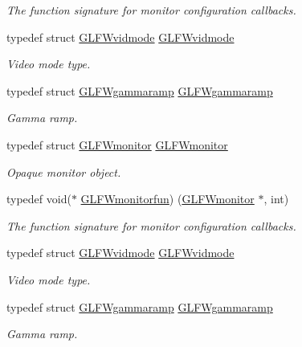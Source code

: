 \begin{DoxyCompactItemize}
\begin{DoxyCompactList}\small\item\em The function signature for monitor configuration callbacks. \end{DoxyCompactList}\item 
typedef struct \hyperlink{structGLFWvidmode}{G\+L\+F\+Wvidmode} \hyperlink{group__monitor_gae48aadf4ea0967e6605c8f58fa5daccb}{G\+L\+F\+Wvidmode}
\begin{DoxyCompactList}\small\item\em Video mode type. \end{DoxyCompactList}\item 
typedef struct \hyperlink{structGLFWgammaramp}{G\+L\+F\+Wgammaramp} \hyperlink{group__monitor_gaec0bd37af673be8813592849f13e02f0}{G\+L\+F\+Wgammaramp}
\begin{DoxyCompactList}\small\item\em Gamma ramp. \end{DoxyCompactList}\item 
typedef struct \hyperlink{group__monitor_ga8d9efd1cde9426692c73fe40437d0ae3}{G\+L\+F\+Wmonitor} \hyperlink{group__monitor_ga8d9efd1cde9426692c73fe40437d0ae3}{G\+L\+F\+Wmonitor}
\begin{DoxyCompactList}\small\item\em Opaque monitor object. \end{DoxyCompactList}\item 
typedef void($\ast$ \hyperlink{group__monitor_ga8a7ee579a66720f24d656526f3e44c63}{G\+L\+F\+Wmonitorfun}) (\hyperlink{group__monitor_ga8d9efd1cde9426692c73fe40437d0ae3}{G\+L\+F\+Wmonitor} $\ast$, int)
\begin{DoxyCompactList}\small\item\em The function signature for monitor configuration callbacks. \end{DoxyCompactList}\item 
typedef struct \hyperlink{structGLFWvidmode}{G\+L\+F\+Wvidmode} \hyperlink{group__monitor_gae48aadf4ea0967e6605c8f58fa5daccb}{G\+L\+F\+Wvidmode}
\begin{DoxyCompactList}\small\item\em Video mode type. \end{DoxyCompactList}\item 
typedef struct \hyperlink{structGLFWgammaramp}{G\+L\+F\+Wgammaramp} \hyperlink{group__monitor_gaec0bd37af673be8813592849f13e02f0}{G\+L\+F\+Wgammaramp}
\begin{DoxyCompactList}\small\item\em Gamma ramp. \end{DoxyCompactList}\item 

\end{DoxyCompactItemize}
